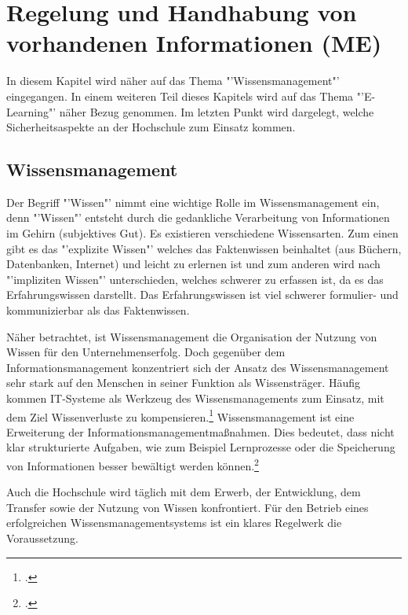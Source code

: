 \section{Regelung und Handhabung von vorhandenen Informationen (ME)}

In diesem Kapitel wird näher auf das Thema "'Wissensmanagement"' eingegangen. In einem weiteren Teil dieses Kapitels wird auf das Thema "'E-Learning"' näher Bezug genommen. Im letzten Punkt wird dargelegt, welche Sicherheitsaspekte an der Hochschule zum Einsatz kommen.

\subsection{Wissensmanagement}

Der Begriff "'Wissen"' nimmt eine wichtige Rolle im Wissensmanagement ein, denn "'Wissen"' entsteht durch die 
gedankliche Verarbeitung von Informationen im Gehirn (subjektives Gut). Es existieren verschiedene Wissensarten. 
Zum einen gibt es das "'explizite Wissen"' welches das Faktenwissen beinhaltet (aus Büchern, Datenbanken, Internet) 
und leicht zu erlernen ist und zum anderen wird nach "'impliziten Wissen"' unterschieden, welches schwerer zu 
erfassen ist, da es das Erfahrungswissen darstellt. Das Erfahrungswissen ist viel schwerer formulier- und 
kommunizierbar als das Faktenwissen. 

Näher betrachtet, ist Wissensmanagement die Organisation der Nutzung von Wissen für den Unternehmenserfolg. 
Doch gegenüber dem Informationsmanagement konzentriert sich der Ansatz des Wissensmanagement sehr stark auf 
den Menschen in seiner Funktion als Wissensträger. Häufig kommen IT-Systeme als Werkzeug des 
Wissensmanagements zum Einsatz, mit dem Ziel Wissenverluste zu kompensieren.\footcite[Vgl.][]{wissensmangement_infowiss.net_2009} Wissensmanagement ist eine 
Erweiterung der Informationsmanagementmaßnahmen. Dies bedeutet, dass nicht klar strukturierte Aufgaben, wie zum 
Beispiel Lernprozesse oder die Speicherung von Informationen besser bewältigt werden können.\footcite[Vgl.][]{wissensmangement_vfhinf.oncampus.de_2013}

Auch die Hochschule wird täglich mit dem Erwerb, der Entwicklung, dem Transfer sowie der Nutzung von 
Wissen konfrontiert. Für den Betrieb eines erfolgreichen Wissensmanagementsystems ist ein klares Regelwerk die Voraussetzung. 

